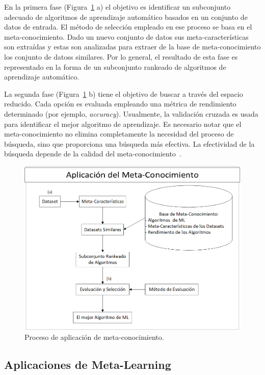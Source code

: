 En la primera fase (Figura~\ref{fig:application} a) el objetivo es identificar
un subconjunto adecuado de algoritmos de aprendizaje automático basados en un
conjunto de datos de entrada. El método de selección empleado en ese proceso se basa en
el meta-conocimiento. Dado un nuevo conjunto de datos sus meta-características son
extraídas y estas son analizadas para extraer de la base de meta-conocimiento
los conjunto de datoss similares. Por lo general, el resultado de esta fase es
representado en la forma de un subconjunto rankeado de algoritmos de
aprendizaje automático.

La segunda fase (Figura~\ref{fig:application} b) tiene el objetivo de buscar a
través del espacio reducido. Cada opción es evaluada empleando una métrica de
rendimiento determinado (por ejemplo, \textit{accuracy}). Usualmente, la
validación cruzada es usada para identificar el mejor algoritmo de aprendizaje.
Es necesario notar que el meta-conocimiento no elimina completamente la
necesidad del proceso de búsqueda, sino que proporciona una búsqueda más
efectiva. La efectividad de la búsqueda depende de la calidad del
meta-conocimiento~.


\begin{figure}[H]
	\centering
	\includegraphics[scale=.5]{Figures/application.png}
	\caption{Proceso de aplicación de meta-conocimiento.}
	\label{fig:application}
\end{figure}

\subsection{Aplicaciones de Meta-Learning}\label{subsec:mtl_aplications}

